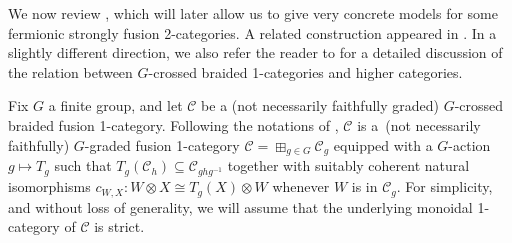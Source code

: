 \documentclass[pdftex]{sigma}
\numberwithin{equation}{section}
\begin{document}
We now review \cite[Construction~2.1.23]{DR}, which will later allow us to give very concrete models for some fermionic strongly fusion 2-categories. A related construction appeared in \cite[Section~6]{Cui}. In a slightly different direction, we also refer the reader to \cite{JPR} for a detailed discussion of the relation between $G$-crossed braided 1-categories and higher categories.

\begin{Construction}\label{con:gradedF2CfromCBF1C}
Fix $G$ a finite group, and let $\mathcal{C}$ be a (not necessarily faithfully graded) $G$-crossed braided fusion 1-category. Following the notations of \cite[Section~8.24]{EGNO}, $\mathcal{C}$ is a~(not necessarily faithfully) $G$-graded fusion 1-category $\mathcal{C}=\boxplus_{g\in G}\mathcal{C}_g$ equipped with a $G$-action~${g\mapsto T_g}$ such that $T_g(\mathcal{C}_h)\subseteq \mathcal{C}_{ghg^{-1}}$ together with suitably coherent natural isomorphisms $c_{W,X}\colon W\otimes X\cong T_g(X)\otimes W$ whenever $W$ is in $\mathcal{C}_g$. For simplicity, and without loss of generality, we will assume that the underlying monoidal 1-category of $\mathcal{C}$ is strict.


\end{Construction}
\end{document}

